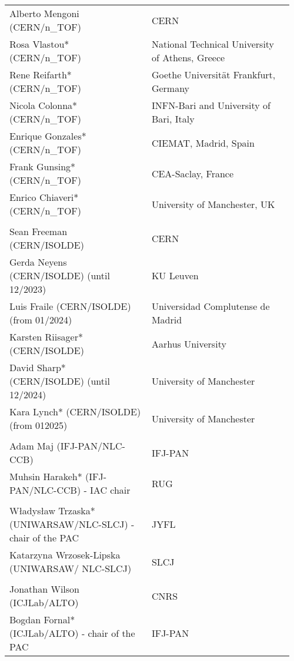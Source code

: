 \begin{longtable}{|L{0.48\linewidth}|C{0.48\linewidth}|}
      \\ \hline
    Alberto Mengoni (CERN/n\_TOF)	& CERN \\ \hline
    Rosa Vlastou* (CERN/n\_TOF)	& National Technical University of Athens, Greece \\ \hline
    Rene Reifarth* (CERN/n\_TOF)	& Goethe Universität Frankfurt, Germany \\ \hline
    Nicola Colonna* (CERN/n\_TOF)	& INFN-Bari and University of Bari, Italy \\ \hline
    Enrique Gonzales* (CERN/n\_TOF)	& CIEMAT, Madrid, Spain \\ \hline
    Frank Gunsing* (CERN/n\_TOF)	& CEA-Saclay, France \\ \hline
    Enrico Chiaveri* (CERN/n\_TOF)	& University of Manchester, UK \\ \hline
    
      \\ \hline
    Sean Freeman (CERN/ISOLDE)	& CERN \\ \hline
    Gerda Neyens (CERN/ISOLDE) (until 12/2023)	& KU Leuven \\ \hline
    Luis Fraile (CERN/ISOLDE) (from 01/2024)	& Universidad Complutense de Madrid \\ \hline
    Karsten Riisager* (CERN/ISOLDE)	& Aarhus University \\ \hline
    David Sharp* (CERN/ISOLDE) (until 12/2024)	& University of Manchester \\ \hline
    Kara Lynch* (CERN/ISOLDE) (from 012025)	& University of Manchester \\ \hline
    
      \\ \hline
    Adam Maj (IFJ-PAN/NLC-CCB)	& IFJ-PAN \\ \hline
    Muhsin Harakeh*  (IFJ-PAN/NLC-CCB) - IAC chair	& RUG \\ \hline

      \\ \hline
    Władysław Trzaska* (UNIWARSAW/NLC-SLCJ) - chair of the PAC	& JYFL \\ \hline
    Katarzyna Wrzosek-Lipska (UNIWARSAW/ NLC-SLCJ)	& SLCJ \\ \hline

        \pagebreak
      \\ \hline
    Jonathan Wilson (ICJLab/ALTO)	& CNRS \\ \hline
    Bogdan Fornal* (ICJLab/ALTO) - chair of the PAC	& IFJ-PAN \\ \hline


\end{longtable}
